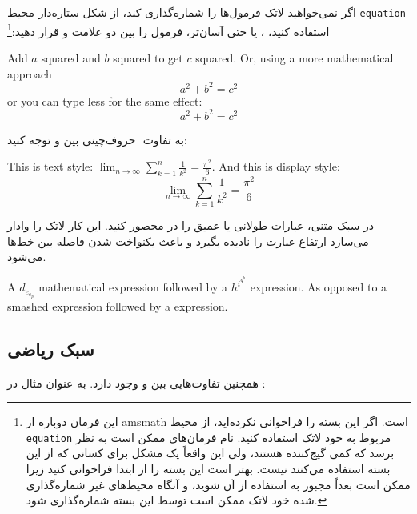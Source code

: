 اگر نمی‌خواهید لاتک فرمول‌ها را شماره‌گذاری کند، از شکل ستاره‌دار محیط  \texttt{equation} استفاده کنید، ، یا حتی آسان‌تر، فرمول را بین دو علامت  \ci{[} و \ci{]} قرار دهید:\footnote{
   این فرمان دوباره از \textsf{amsmath} است. اگر این بسته را فراخوانی نکرده‌اید، از محیط \texttt{equation} مربوط به خود لاتک استفاده کنید. نام فرمان‌های  ممکن است به نظر برسد که کمی گیج‌کننده  هستند، ولی این واقعاً یک مشکل برای کسانی که از این بسته استفاده می‌کنند نیست. بهتر است این بسته را از ابتدا فراخوانی کنید زیرا ممکن است بعداً مجبور به استفاده از آن شوید، و آنگاه محیط‌های غیر‌ شماره‌گذاری شده خود لاتک ممکن است توسط این بسته شماره‌گذاری شود.}
\begin{example}
Add $a$ squared and $b$ squared
to get $c$ squared. Or, using
a more mathematical approach
 \begin{equation*}
   a^2 + b^2 = c^2
 \end{equation*}
or you can type less for the
same effect:
 \[ a^2 + b^2 = c^2 \]
\end{example}

به تفاوت ‌ حروف‌چینی بین 
 و 
 توجه کنید: 
\begin{example}
This is text style: 
$\lim_{n \to \infty} 
 \sum_{k=1}^n \frac{1}{k^2} 
 = \frac{\pi^2}{6}$.
And this is display style:
 \begin{equation}
  \lim_{n \to \infty} 
  \sum_{k=1}^n \frac{1}{k^2} 
  = \frac{\pi^2}{6}
 \end{equation}
\end{example}

در سبک‌ متنی، عبارات طولانی یا عمیق را در   محصور کنید. این کار لاتک را وادار می‌سازد ارتفاع عبارت را نادیده بگیرد و باعث یکنواخت شدن فاصله بین خط‌ها می‌شود.

\begin{example}
A $d_{e_{e_p}}$ mathematical
expression  followed by a
$h^{i^{g^h}}$ expression. As
opposed to a smashed 
 expression 
followed by a
 expression.
\end{example}
\subsection{سبک ریاضی}

همچنین تفاوت‌هایی بین 
 و 
وجود دارد. به عنوان مثال در :

